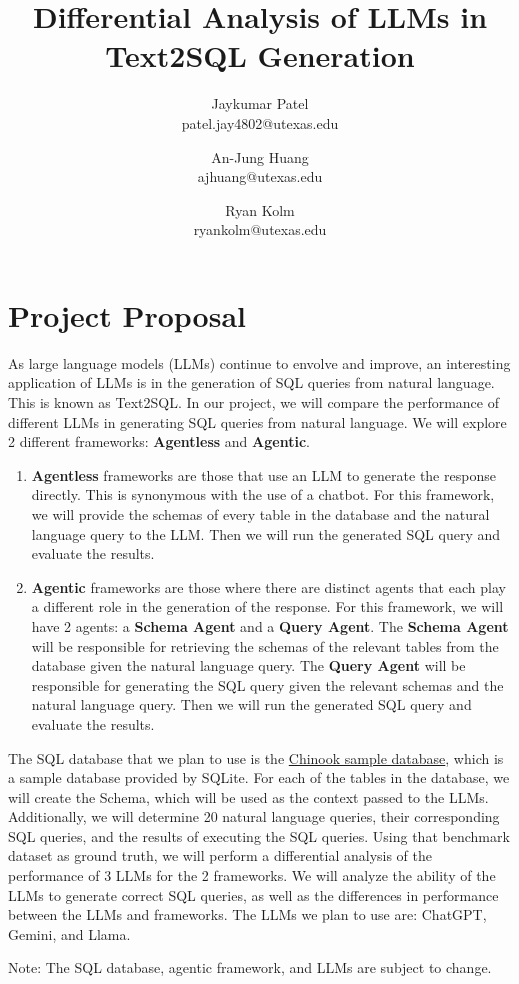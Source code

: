 \documentclass[10pt]{article}
\title{Differential Analysis of LLMs in Text2SQL Generation}
\author{Jaykumar Patel\\
patel.jay4802@utexas.edu\\
\and
An-Jung Huang\\
ajhuang@utexas.edu\\
\and
Ryan Kolm\\
ryankolm@utexas.edu\\
}
\begin{document}
\maketitle

\section{Project Proposal}

As large language models (LLMs) continue to envolve and improve, an interesting application of LLMs is in the generation of SQL queries from natural language. This is known as Text2SQL. 
In our project, we will compare the performance of different LLMs in generating SQL queries from natural language. We will explore 2 different frameworks: \textbf{Agentless} and \textbf{Agentic}.

\begin{enumerate}
    \item \textbf{Agentless} frameworks are those that use an LLM to generate the response directly. This is synonymous with the use of a chatbot. For this framework, we will provide the schemas of every table in the database and the natural language query to the LLM. Then we will run the generated SQL query and evaluate the results.
    \item \textbf{Agentic} frameworks are those where there are distinct agents that each play a different role in the generation of the response. For this framework, we will have 2 agents: a \textbf{Schema Agent} and a \textbf{Query Agent}. The \textbf{Schema Agent} will be responsible for retrieving the schemas of the relevant tables from the database given the natural language query. The \textbf{Query Agent} will be responsible for generating the SQL query given the relevant schemas and the natural language query. Then we will run the generated SQL query and evaluate the results.
\end{enumerate}

The SQL database that we plan to use is the \href{https://www.sqlitetutorial.net/sqlite-sample-database/}{Chinook sample database}, which is a sample database provided by SQLite. For each of the tables in the database, we will create the Schema, which will be used as the context passed to the LLMs. Additionally, we will determine 20 natural language queries, their corresponding SQL queries, and the results of executing the SQL queries. Using that benchmark dataset as ground truth, we will perform a differential analysis of the performance of 3 LLMs for the 2 frameworks. We will analyze the ability of the LLMs to generate correct SQL queries, as well as the differences in performance between the LLMs and frameworks. The LLMs we plan to use are: ChatGPT, Gemini, and Llama. 

Note: The SQL database, agentic framework, and LLMs are subject to change.
\end{document}
